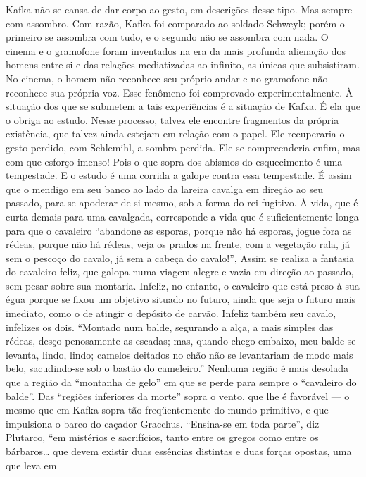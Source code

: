 Kafka não se cansa de dar corpo ao gesto, em descrições desse tipo. Mas
sempre com assombro. Com razão, Kafka foi comparado ao soldado Schweyk;
porém o primeiro se assombra com tudo, e o segundo não se assombra com
nada. O cinema e o gramofone foram inventados na era da mais profunda
alienação dos homens entre si e das relações mediatizadas ao infinito,
as únicas que subsistiram. No cinema, o homem não reconhece seu próprio
andar e no gramofone não reconhece sua própria voz. Esse fenômeno foi
comprovado experimentalmente. À situação dos que se submetem a tais
experiências é a situação de Kafka. É ela que o obriga ao estudo. Nesse
processo, talvez ele encontre fragmentos da própria existência, que
talvez ainda estejam em relação com o papel. Ele recuperaria o gesto
perdido, com Schlemihl, a sombra perdida. Ele se compreenderia enfim,
mas com que esforço imenso! Pois o que sopra dos abismos do esquecimento
é uma tempestade. E o estudo é uma corrida a galope contra essa
tempestade. É assim que o mendigo em seu banco ao lado da lareira
cavalga em direção ao seu passado, para se apoderar de si mesmo, sob a
forma do rei fugitivo. Ã vida, que é curta demais para uma cavalgada,
corresponde a vida que é suficientemente longa para que o cavaleiro
``abandone as esporas, porque não há esporas, jogue fora as rédeas,
porque não há rédeas, veja os prados na frente, com a vegetação rala, já
sem o pescoço do cavalo, já sem a cabeça do cavalo!'', Assim se realiza
a fantasia do cavaleiro feliz, que galopa numa viagem alegre e vazia em
direção ao passado, sem pesar sobre sua montaria. Infeliz, no entanto, o
cavaleiro que está preso à sua égua porque se fixou um objetivo situado
no futuro, ainda que seja o futuro mais imediato, como o de atingir o
depósito de carvão. Infeliz também seu cavalo, infelizes os dois.
``Montado num balde, segurando a alça, a mais simples das rédeas, desço
penosamente as escadas; mas, quando chego embaixo, meu balde se levanta,
lindo, lindo; camelos deitados no chão não se levantariam de modo mais
belo, sacudindo-se sob o bastão do cameleiro.'' Nenhuma região é mais
desolada que a região da ``montanha de gelo'' em que se perde para
sempre o ``cavaleiro do balde''. Das ``regiões inferiores da morte''
sopra o vento, que lhe é favorável --- o mesmo que em Kafka sopra tão
freqüentemente do mundo primitivo, e que impulsiona o barco do caçador
Gracchus. ``Ensina-se em toda parte'', diz Plutarco, ``em mistérios e
sacrifícios, tanto entre os gregos como entre os bárbaros\ldots{} que devem
existir duas essências distintas e duas forças opostas, uma que leva em
